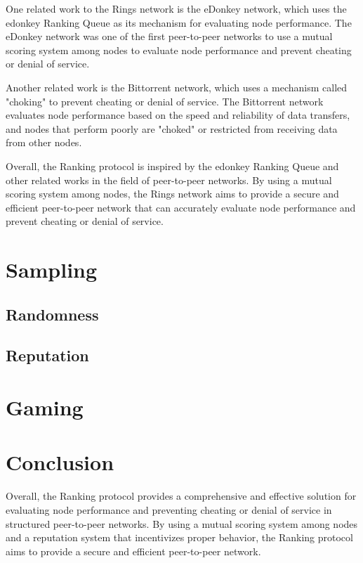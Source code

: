 \documentclass[twocolumn]{article}
\begin{document}
One related work to the Rings network is the eDonkey network, which uses the edonkey Ranking Queue as its mechanism for evaluating node performance. The eDonkey network was one of the first peer-to-peer networks to use a mutual scoring system among nodes to evaluate node performance and prevent cheating or denial of service.

Another related work is the Bittorrent network, which uses a mechanism called "choking" to prevent cheating or denial of service. The Bittorrent network evaluates node performance based on the speed and reliability of data transfers, and nodes that perform poorly are "choked" or restricted from receiving data from other nodes.

Overall, the Ranking protocol is inspired by the edonkey Ranking Queue and other related works in the field of peer-to-peer networks. By using a mutual scoring system among nodes, the Rings network aims to provide a secure and efficient peer-to-peer network that can accurately evaluate node performance and prevent cheating or denial of service.

\section{Sampling}
\subsection{Randomness}
\subsection{Reputation}

\section{Gaming}

\section{Conclusion}
Overall, the Ranking protocol provides a comprehensive and effective solution for evaluating node performance and preventing cheating or denial of service in structured peer-to-peer networks. By using a mutual scoring system among nodes and a reputation system that incentivizes proper behavior, the Ranking protocol aims to provide a secure and efficient peer-to-peer network.



\end{document}
